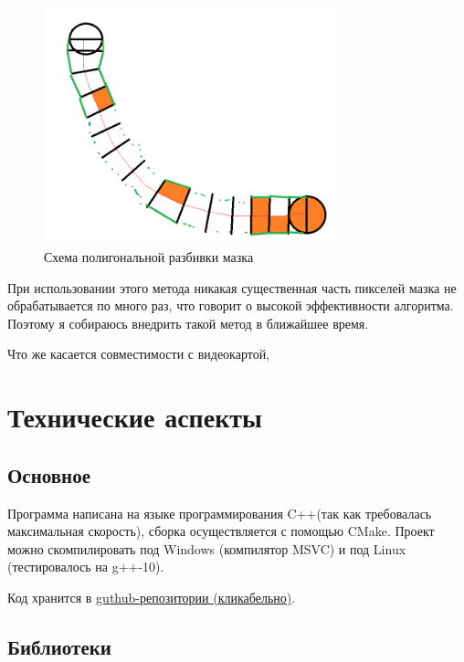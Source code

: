 \documentclass[11pt]{article}
\begin{document}
\begin{itemize}
        \begin{figure}
            \centering
            \includegraphics[width=0.75\textwidth]{polygonal_stroke.png}
            \caption{Схема полигональной разбивки мазка}
            \label{fig:polygonal_stroke}
        \end{figure}

        При использовании этого метода никакая существенная часть пикселей мазка не обрабатывается по много раз, что говорит о высокой эффективности алгоритма.
        Поэтому я собираюсь внедрить такой метод в ближайшее время.
    \end{itemize}

    Что же касается совместимости с видеокартой,

    \section{Технические аспекты}\label{sec:tecnical}

    \subsection{Основное}\label{subsec:major}
    Программа написана на языке программирования C++(так как требовалась максимальная скорость), сборка осуществляется с помощью CMake.
    Проект можно скомпилировать под Windows (компилятор MSVC) и под Linux (тестировалось на g++-10).

    Код хранится в \href{https://github.com/donRumata03/Painter}{guthub-репозитории (кликабельно)}.

    \subsection{Библиотеки}\label{subsec:libs}
\end{document}
